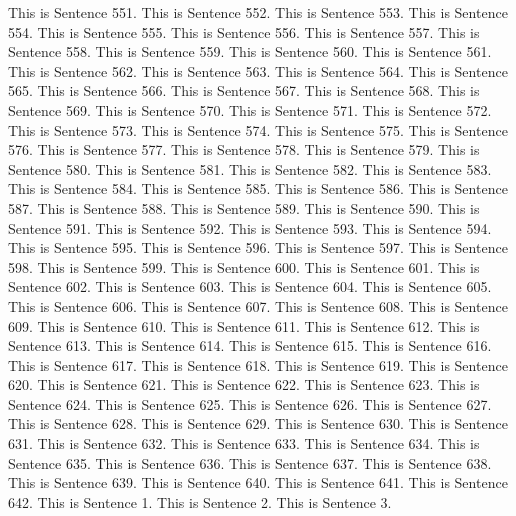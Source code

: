 \documentclass{article}
\begin{document}
This is Sentence 551.
This is Sentence 552.
This is Sentence 553.
This is Sentence 554.
This is Sentence 555.
This is Sentence 556.
This is Sentence 557.
This is Sentence 558.
This is Sentence 559.
This is Sentence 560.
This is Sentence 561.
This is Sentence 562.
This is Sentence 563.
This is Sentence 564.
This is Sentence 565.
This is Sentence 566.
This is Sentence 567.
This is Sentence 568.
This is Sentence 569.
This is Sentence 570.
This is Sentence 571.
This is Sentence 572.
This is Sentence 573.
This is Sentence 574.
This is Sentence 575.
This is Sentence 576.
This is Sentence 577.
This is Sentence 578.
This is Sentence 579.
This is Sentence 580.
This is Sentence 581.
This is Sentence 582.
This is Sentence 583.
This is Sentence 584.
This is Sentence 585.
This is Sentence 586.
This is Sentence 587.
This is Sentence 588.
This is Sentence 589.
This is Sentence 590.
This is Sentence 591.
This is Sentence 592.
This is Sentence 593.
This is Sentence 594.
This is Sentence 595.
This is Sentence 596.
This is Sentence 597.
This is Sentence 598.
This is Sentence 599.
This is Sentence 600.
This is Sentence 601.
This is Sentence 602.
This is Sentence 603.
This is Sentence 604.
This is Sentence 605.
This is Sentence 606.
This is Sentence 607.
This is Sentence 608.
This is Sentence 609.
This is Sentence 610.
This is Sentence 611.
This is Sentence 612.
This is Sentence 613.
This is Sentence 614.
This is Sentence 615.
This is Sentence 616.
This is Sentence 617.
This is Sentence 618.
This is Sentence 619.
This is Sentence 620.
This is Sentence 621.
This is Sentence 622.
This is Sentence 623.
This is Sentence 624.
This is Sentence 625.
This is Sentence 626.
This is Sentence 627.
This is Sentence 628.
This is Sentence 629.
This is Sentence 630.
This is Sentence 631.
This is Sentence 632.
This is Sentence 633.
This is Sentence 634.
This is Sentence 635.
This is Sentence 636.
This is Sentence 637.
This is Sentence 638.
This is Sentence 639.
This is Sentence 640.
This is Sentence 641.
This is Sentence 642.
This is Sentence 1.
This is Sentence 2.
This is Sentence 3.
\end{document}
